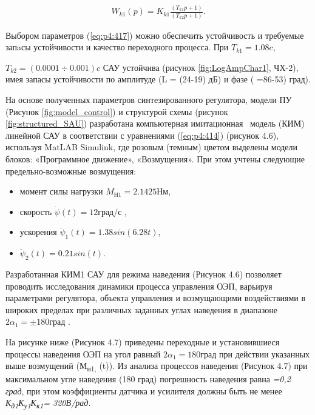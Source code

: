 \begin{equation}%
\label{eq:p4:417}
\begin{alignedat}{2}
W_{k1} \left( p \right) =K_{k1}\frac{ \left( T_{k1}p+1 \right) }{ \left( T_{k2}p+1 \right) }.
\end{alignedat}
\end{equation}

Выбором параметров (\ref{eq:p4:417}) можно обеспечить устойчивость и требуемые запaсы устойчивости и качество переходного процесса. При $T_{k1} = 1.08 c$, \par

$T_{k2} = (0.0001  \div 0.001) c$  САУ устойчива (рисунок \ref{fig:LogAmpChar1}, ЧХ-2), имея запасы устойчивости по амплитуде (L = (24-19) дБ) и фазе ( =86-53) град).\par

На основе полученных параметров синтезированного регулятора, модели ПУ (Рисунок \ref{fig:model_control}) и структурой схемы (рисунок \ref{fig:structured_SAU}) разработана компьютерная имитационная \  модель (КИМ) линейной САУ в соответствии с уравнениями (\ref{eq:p4:414}) (рисунок 4.6), используя MatLAB Simulink, где розовым (темным) цветом выделены модели блоков: «Программное движение», «Возмущения». При этом учтены следующие предельно-возможные возмущения: 
\begin{itemize}
	\item момент силы нагрузки $M_{\textit{Н1}} = 2.1425 \textit{Нм}$,
	\item скорость \( \dot \psi  \left( t \right) = 12 \textit{град/с} \) ,
	\item ускорения \(  \ddot \psi _{1} \left( t \right) =1.38sin \left( 6.28 t \right) \),
	\item \( \ddot \psi_2 (t) = 0.21 sin(t) \).
\end{itemize}


Разработанная КИМ1 САУ для режима наведения (Рисунок 4.6) позволяет проводить исследования динамики процесса управления ОЭП, варьируя параметрами регулятора, объекта управления и возмущающими воздействиями в широких пределах при различных заданных углах наведения в диапазоне  \( 2 \alpha _{1}= \pm 180град \) .\par

На рисунке ниже (Рисунок 4.7) приведены переходные и установившиеся процессы наведения ОЭП на угол равный  \( 2 \alpha _{1}=180 град \)  при действии указанных выше возмущений (М\textsubscript{н1, }(t)). Из анализа процессов наведения (Рисунок 4.7) при максимальном угле наведения (180 град) погрешность наведения равна \textit{ =0,2 град}, при этом коэффициенты датчика и усилителя должны быть не менее \textit{К\textsubscript{д1}К\textsubscript{у1}К\textsubscript{к1}= 320В/рад.}\par

